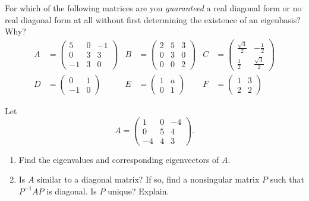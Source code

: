 \documentclass[12pt]{article}
\theoremstyle{remark}
\newtheorem*{solution}{Solution}
\newcommand{\inv}{^{-1}}
\renewcommand{\=}{&=&}
\newcommand{\<}{\langle}
\renewcommand{\>}{\rangle}
\newcommand{\bmat}{\begin{pmatrix}}
\newcommand{\emat}{\end{pmatrix}}
\begin{document}
\begin{problems}


\item

For which of the following matrices are you \emph{guaranteed} a real diagonal form or no
real diagonal form at all without first determining the existence of an eigenbasis? Why?
\begin{align*}
	A &= \bmat 5 & 0 & -1 \\ 0 & 3 & 3 \\ -1 & 3 & 0 \emat &
	B &= \bmat 2 & 5 & 3 \\ 0 & 3 & 0 \\ 0 & 0 & 2 \emat &
	C &= \bmat \frac{\sqrt{3}}{2} & -\frac{1}{2} \\ \frac{1}{2} & \frac{\sqrt{3}}{2} \emat \\
	D &= \bmat 0 & 1 \\ -1 & 0 \emat &
	E &= \bmat 1 & a \\ 0 & 1 \emat &
	F &= \bmat 1 & 3 \\ 2 & 2 \emat
\end{align*}

	

\item 
Let $$A = \bmat 1 &  0 & -4 \\ 0 & 5 & 4 \\ -4 & 4 & 3 \emat.$$
\begin{enumerate}
	\item Find the eigenvalues and corresponding eigenvectors of $A$.
	
	
	\item Is $A$ similar to a diagonal matrix? If so, find a nonsingular matrix $P$ such that
	$P\inv A P$ is diagonal. Is $P$ unique? Explain.
	
	

\end{enumerate}
\end{problems}
\end{document}
